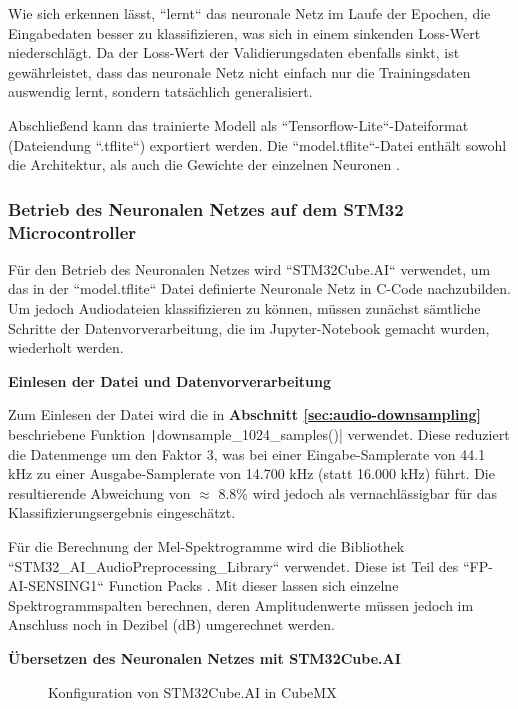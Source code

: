 Wie sich erkennen lässt, ``lernt`` das neuronale Netz im Laufe der Epochen, die Eingabedaten besser zu klassifizieren, was sich in einem sinkenden Loss-Wert niederschlägt. Da der Loss-Wert der Validierungsdaten ebenfalls sinkt, ist gewährleistet, dass das neuronale Netz nicht einfach nur die Trainingsdaten auswendig lernt, sondern tatsächlich generalisiert.

Abschließend kann das trainierte Modell als ``Tensorflow-Lite``-Dateiformat (Dateiendung ``.tflite``) exportiert werden. Die ``model.tflite``-Datei enthält sowohl die Architektur, als auch die Gewichte der einzelnen Neuronen \cite{tflite-file}.


\subsubsection{Betrieb des Neuronalen Netzes auf dem STM32 Microcontroller}

Für den Betrieb des Neuronalen Netzes wird ``STM32Cube.AI`` verwendet, um das in der ``model.tflite`` Datei definierte Neuronale Netz in C-Code nachzubilden. Um jedoch Audiodateien klassifizieren zu können, müssen zunächst sämtliche Schritte der Datenvorverarbeitung, die im Jupyter-Notebook gemacht wurden, wiederholt werden.

\textbf{Einlesen der Datei und Datenvorverarbeitung}


Zum Einlesen der Datei wird die in \textbf{Abschnitt \ref{sec:audio-downsampling}} beschriebene Funktion \texttt|downsample_1024_samples()| verwendet. Diese reduziert die Datenmenge um den Faktor 3, was bei einer Eingabe-Samplerate von 44.1 kHz zu einer Ausgabe-Samplerate von 14.700 kHz (statt 16.000 kHz) führt. Die resultierende Abweichung von $\approx$ 8.8\% wird jedoch als vernachlässigbar für das Klassifizierungsergebnis eingeschätzt.

Für die Berechnung der Mel-Spektrogramme wird die Bibliothek ``STM32\_AI\_AudioPreprocessing\_Library`` verwendet. Diese ist Teil des ``FP-AI-SENSING1`` Function Packs \cite{fp-ai-sensing1}. Mit dieser lassen sich einzelne Spektrogrammspalten berechnen, deren Amplitudenwerte müssen jedoch im Anschluss noch in Dezibel (dB) umgerechnet werden.

\textbf{Übersetzen des Neuronalen Netzes mit STM32Cube.AI}


\begin{figure} %
	\vspace{-20pt + 0.02\textwidth}
	\hspace{0.02\textwidth} %
	\caption{Konfiguration von STM32Cube.AI in CubeMX}
	\label{fig:img-training-graph}
\end{figure}

